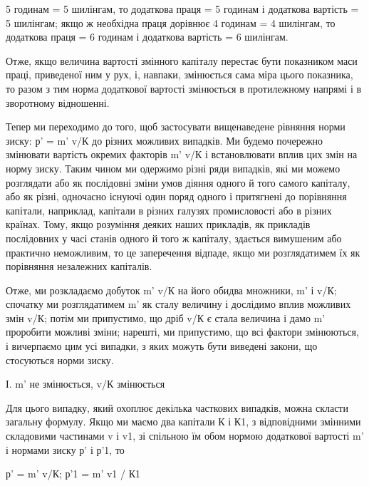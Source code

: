 \parcont{}  %
5 годинам = 5 шилінгам, то додаткова праця = 5 годинам і додаткова
вартість = 5 шилінгам; якщо ж необхідна праця дорівнює
4 годинам = 4 шилінгам, то додаткова праця = 6 годинам і додаткова
вартість = 6 шилінгам.

Отже, якщо величина вартості змінного капіталу перестає
бути показником маси праці, приведеної ним у рух, і, навпаки,
змінюється сама міра цього показника, то разом з тим норма
додаткової вартості змінюється в протилежному напрямі і в зворотному
відношенні.

Тепер ми переходимо до того, щоб застосувати вищенаведене
рівняння норми зиску: р' = m' v/К до різних можливих випадків.
Ми будемо почережно змінювати вартість окремих факторів
m' v/К і встановлювати вплив цих змін на норму зиску. Таким
чином ми одержимо різні ряди випадків, які ми можемо розглядати
або як послідовні зміни умов діяння одного й того
самого капіталу, або як різні, одночасно існуючі один поряд
одного і притягнені до порівняння капітали, наприклад, капітали
в різних галузях промисловості або в різних країнах. Тому,
якщо розуміння деяких наших прикладів, як прикладів послідовних
у часі станів одного й того ж капіталу, здається вимушеним
або практично неможливим, то це заперечення відпаде,
якщо ми розглядатимем їх як порівняння незалежних капіталів.

Отже, ми розкладаємо добуток m' v/К на його обидва множники,
m' і v/К; спочатку ми розглядатимем m' як сталу величину
і дослідимо вплив можливих змін v/К; потім ми припустимо, що
дріб v/К є стала величина і дамо m' проробити можливі зміни;
нарешті, ми припустимо, що всі фактори змінюються, і вичерпаємо
цим усі випадки, з яких можуть бути виведені закони,
що стосуються норми зиску.

І. m' не змінюється, v/К змінюється

Для цього випадку, який охоплює декілька часткових випадків,
можна скласти загальну формулу. Якщо ми маємо два
капітали К і К1, з відповідними змінними складовими частинами
v і v1, зі спільною їм обом нормою додаткової вартості m' і нормами
зиску р' і р'1, то

р' = m' v/К; р'1 = m' v1 / К1
